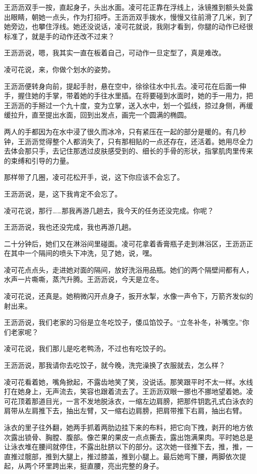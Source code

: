 \documentclass[lang=cn,newtx,12pt,scheme=chinese]{elegantbook}
\begin{document}
王沥沥双手一按，直起身子，头出水面。凌可花正靠在浮线上，泳镜推到额头处露出眼睛，朝她一点头，作为打招呼。王沥沥双手拨水，慢慢又往前滑了几米，到了她旁边，也攀住浮线。她还没说话，凌可花就说，我刚才看到，你腿的动作已经很标准了，就是手的动作还改不过来？

王沥沥说，嗯，我其实一直在板着自己，可动作一旦定型了，真是难改。

凌可花说，来，你做个划水的姿势。

王沥沥便转身向前，提起手肘，悬在空中，徐徐往水中扎去。凌可花在后面一伸手，握住她的手掌，带着她的手往水里插。在将要碰到水面时，她的手一用力，把王沥沥的手掰过一个九十度，变为立掌，送入水中，划一个弧线，掠过身侧，再缓缓拉升，直至提出水面，回到出发点，画完一个圆满的椭圆。

两人的手都因为在水中浸了很久而冰冷，只有紧压在一起的部分是暖的。有几秒钟，王沥沥觉得整个人都消失了，只有那相贴的一点还存在，还活着。她用尽全力去体会那只手，去记住那透过皮肤感受到的、细长的手骨的形状，指掌肌肉里传来的束缚和引导的力量。

那样带了几圈，凌可花松开手，说，这下你应该不会忘了。

王沥沥说，是，这下我肯定不会忘了。

凌可花说，那行……那我再游几趟去，我今天的任务还没完成。你呢？

王沥沥说，我也还没完成，我也再游几趟。

二十分钟后，她们又在淋浴间里碰面。凌可花拿着香膏瓶子走到淋浴区，王沥沥正在其中一个隔间的喷头下冲洗，见了她，说，嘿。

凌可花点点头，走进她对面的隔间，放好洗浴用品瓶。她们的两个隔壁间都有人，水声一片嘶嘶，蒸汽升腾。王沥沥说，今天是立冬。

凌可花说，还真是。她稍微闪开点身子，扳开水掣，水像一声令下，万箭齐发似的射出来。

王沥沥说，我们老家的习俗是立冬吃饺子，倭瓜馅饺子。“立冬补冬，补嘴空。”你们老家呢？

凌可花说，我们那儿是吃老鸭汤，不过也有吃饺子的。

王沥沥说，那我请你去吃饺子，就今晚，洗完澡换了衣服就去，怎么样？

凌可花看着她，嘴角掀起，不露齿地笑了笑，没说话。那笑跟平时不太一样。水线打在她身上，无声流去，笑容也跟着流去了。王沥沥双眼一挪也不挪地望着她。凌可花顶着那道目光，一言不发地脱泳衣，一缩左边肩膀，把那件钥匙孔式白泳衣的肩带从左肩推下去，抽出左臂，又一缩右边肩膀，把肩带推下右肩，抽出右臂。

泳衣的里子往外翻，她两手抓着两肋边挂下来的布料，把它向下拽，剥开的地方依次露出锁骨、胸膛、腹部。像芒果的果皮一点点撕去，露出饱满果肉。平时她总是让泳衣堆在腰间就停住，不露出肚脐以下的部分。这次她一径推下去，推，推，一直推过髋部，推到大腿上，推过膝盖，推到小腿上。最后她弯下腰，两脚依次提起，从两个环里跨出来，挺直腰，亮出完整的身子。
\end{document}
